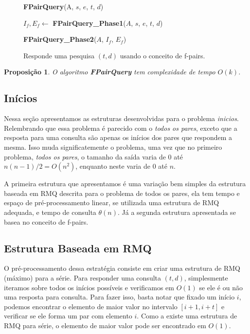 \documentclass[12pt]{article}
\newtheorem{prop}[thm]{Proposição}
\begin{document}
\begin{figure}
\begin{framed}
{\bf FPairQuery}(A, $s$, $e$, $t$, $d$)

\hspace{1cm} $I_f, E_f \leftarrow$ {\bf FPairQuery\_Phase1}($A$, $s$, $e$, $t$, $d$)

\hspace{1cm} {\bf FPairQuery\_Phase2}($A$, $I_f$, $E_f$)
\end{framed}
\caption{Responde uma pesquisa $(t, d)$ usando o conceito de f-pairs.}
\label{fpairquery}
\end{figure}

\begin{prop}
O algoritmo {\bf FPairQuery} tem complexidade de tempo $O(k)$.
\end{prop}

\subsection{Inícios}

Nessa seção apresentamos as estruturas desenvolvidas para o problema \textit{inicios}.
Relembrando que essa problema é parecido com o \textit{todos os pares}, exceto que a
resposta para uma consulta são apenas os inícios dos pares que respondem a mesma. Isso
muda significatemente o problema, uma vez que no primeiro problema, \textit{todos os pares},
o tamanho da saída varia de $0$ até $n(n-1)/2 = O(n^2)$, enquanto neste varia de $0$ até $n$.

A primeira estrutura que apresentamos é uma variação bem simples da estrutura baseada
em RMQ descrita para o problema de todos os pares, ela tem tempo e espaço de pré-processamento
linear, se utilizada uma estrutura de RMQ adequada, e tempo de consulta $\theta(n)$. Já
a segunda estrutura apresentada se basea no conceito de f-pairs.

\subsection{Estrutura Baseada em RMQ}

O pré-processamento dessa estratégia consiste em criar uma estrutura de RMQ (máximo)
para a série. Para responder uma consulta $(t, d)$, simplesmente iteramos sobre todos
os inícios possíveis e verificamos em $O(1)$ se ele é ou não uma resposta para consulta.
Para fazer isso, basta notar que fixado um início $i$, podemos encontrar o elemento de maior valor
no intervalo $[i + 1, i + t]$ e verificar se ele forma um par com elemento $i$.
 Como a existe uma estrutura de RMQ para série, o elemento de maior valor
pode ser encontrado em $O(1)$.
\end{document}
